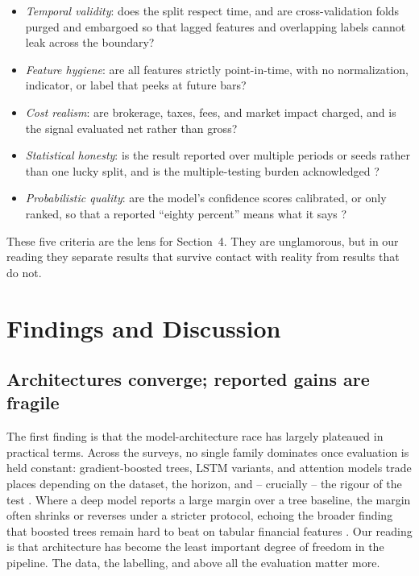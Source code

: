 \documentclass[10pt,a4paper,twocolumn]{article}
\begin{document}
\begin{itemize}
  \item \textit{Temporal validity}: does the split respect time, and are cross-validation folds purged and embargoed so that lagged features and overlapping labels cannot leak across the boundary?
  \item \textit{Feature hygiene}: are all features strictly point-in-time, with no normalization, indicator, or label that peeks at future bars?
  \item \textit{Cost realism}: are brokerage, taxes, fees, and market impact charged, and is the signal evaluated net rather than gross?
  \item \textit{Statistical honesty}: is the result reported over multiple periods or seeds rather than one lucky split, and is the multiple-testing burden acknowledged \cite{harvey2016}?
  \item \textit{Probabilistic quality}: are the model's confidence scores calibrated, or only ranked, so that a reported ``eighty percent'' means what it says \cite{guo2017}?
\end{itemize}

These five criteria are the lens for Section~4. They are unglamorous, but in our reading they separate results that survive contact with reality from results that do not.

\section{Findings and Discussion}

\subsection{Architectures converge; reported gains are fragile}

The first finding is that the model-architecture race has largely plateaued in practical terms. Across the surveys, no single family dominates once evaluation is held constant: gradient-boosted trees, LSTM variants, and attention models trade places depending on the dataset, the horizon, and -- crucially -- the rigour of the test \cite{bustos2020,kumbure2022}. Where a deep model reports a large margin over a tree baseline, the margin often shrinks or reverses under a stricter protocol, echoing the broader finding that boosted trees remain hard to beat on tabular financial features \cite{krauss2017}. Our reading is that architecture has become the least important degree of freedom in the pipeline. The data, the labelling, and above all the evaluation matter more.
\end{document}
